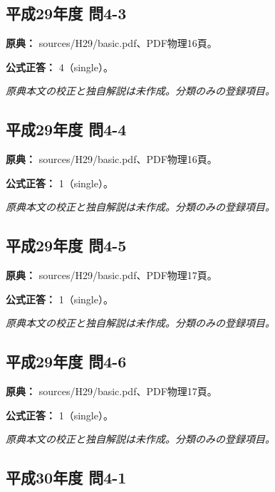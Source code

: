 \subsection{平成29年度 問4-3}
\label{q:h29-reg-basic-4-3}

\noindent\textbf{原典：} sources/H29/basic.pdf、PDF物理16頁。

\textbf{公式正答：} 4（single）。

\par\textit{原典本文の校正と独自解説は未作成。分類のみの登録項目。}

\subsection{平成29年度 問4-4}
\label{q:h29-reg-basic-4-4}

\noindent\textbf{原典：} sources/H29/basic.pdf、PDF物理16頁。

\textbf{公式正答：} 1（single）。

\par\textit{原典本文の校正と独自解説は未作成。分類のみの登録項目。}

\subsection{平成29年度 問4-5}
\label{q:h29-reg-basic-4-5}

\noindent\textbf{原典：} sources/H29/basic.pdf、PDF物理17頁。

\textbf{公式正答：} 1（single）。

\par\textit{原典本文の校正と独自解説は未作成。分類のみの登録項目。}

\subsection{平成29年度 問4-6}
\label{q:h29-reg-basic-4-6}

\noindent\textbf{原典：} sources/H29/basic.pdf、PDF物理17頁。

\textbf{公式正答：} 1（single）。

\par\textit{原典本文の校正と独自解説は未作成。分類のみの登録項目。}

\subsection{平成30年度 問4-1}
\label{q:h30-reg-basic-4-1}

